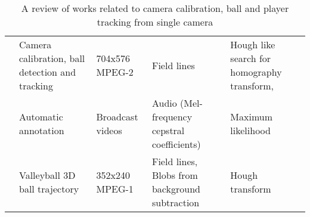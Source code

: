 \begin{table}[ht]
\begin{adjustbox}{width=1\textwidth, angle=0}
\begin{tabular}{  l l l l l  }
		\cite{Yu:2009ch} & Camera calibration, ball detection and tracking & 704x576 MPEG-2 & Field lines & Hough like search for homography transform,  \\
		
		\cite{Yan:2014hk} & Automatic annotation & Broadcast videos & Audio (Mel-frequency cepstral coefficients)  & Maximum likelihood  \\
		
		\cite{Chen:2011is} & Valleyball 3D ball trajectory & 352x240 MPEG-1 & Field lines, Blobs from background subtraction  & Hough transform \\
				
		\hline
	\end{tabular}
	\end{adjustbox}
	\caption{A review of works related to camera calibration, ball and player tracking  from single camera}
	\label{table:ReviewBallDetection}
\end{table}
